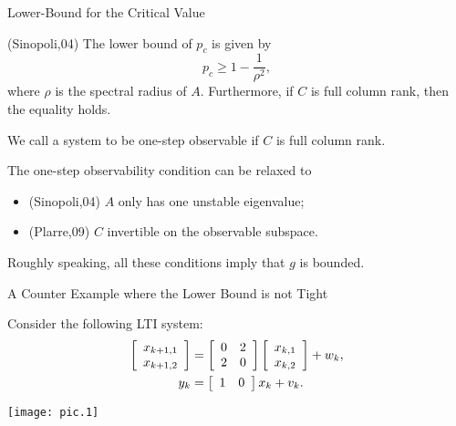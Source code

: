 \documentclass{beamer}
\begin{document}
  \begin{frame}{Lower-Bound for the Critical Value}
    \begin{theorem}
      (Sinopoli,04) The lower bound of $p_c$ is given by
      \begin{displaymath}
	p_c \geq 1-\frac{1}{\rho^2}, 
      \end{displaymath}
      where $\rho$ is the spectral radius of $A$. Furthermore, if $C$ is full column rank, then the equality holds.
    \end{theorem}
    We call a system to be one-step observable if $C$ is full column rank.

    The one-step observability condition can be relaxed to
    \begin{itemize}
      \item (Sinopoli,04) $A$ only has one unstable eigenvalue;
      \item (Plarre,09) $C$ invertible on the observable subspace.
    \end{itemize}
    Roughly speaking, all these conditions imply that $g$ is bounded.
  \end{frame}

  \begin{frame}{A Counter Example where the Lower Bound is not Tight}

    Consider the following LTI system:
    \begin{displaymath}
      \begin{split}
       \left[ {\begin{array}{*{20}c}
	 x_{k+1,1}  \\
	 x_{k+1,2}
      \end{array}} \right] &=
\left[ {\begin{array}{*{20}c}
	0 & 2  \\
	2 & 0 
      \end{array}} \right]  \left[ {\begin{array}{*{20}c}
	 x_{k,1}  \\
	 x_{k,2}
      \end{array}} \right] + w_k,\\
      y_k &= \left[ {\begin{array}{*{20}c}
	1 & 0 
      \end{array}} \right] x_k + v_k.
      \end{split}
    \end{displaymath}
    \begin{center}
      \texttt{[image: pic.1]}
    \end{center}
  \end{frame}
\end{document}
